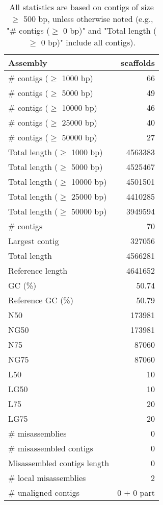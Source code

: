 \documentclass[12pt,a4paper]{article}
\begin{document}
\begin{table}[ht]
\begin{center}
\caption{All statistics are based on contigs of size $\geq$ 500 bp, unless otherwise noted (e.g., "\# contigs ($\geq$ 0 bp)" and "Total length ($\geq$ 0 bp)" include all contigs).}
\begin{tabular}{|l*{1}{|r}|}
\hline
Assembly & scaffolds \\ \hline
\# contigs ($\geq$ 1000 bp) & 66 \\ \hline
\# contigs ($\geq$ 5000 bp) & 49 \\ \hline
\# contigs ($\geq$ 10000 bp) & 46 \\ \hline
\# contigs ($\geq$ 25000 bp) & 40 \\ \hline
\# contigs ($\geq$ 50000 bp) & 27 \\ \hline
Total length ($\geq$ 1000 bp) & 4563383 \\ \hline
Total length ($\geq$ 5000 bp) & 4525467 \\ \hline
Total length ($\geq$ 10000 bp) & 4501501 \\ \hline
Total length ($\geq$ 25000 bp) & 4410285 \\ \hline
Total length ($\geq$ 50000 bp) & 3949594 \\ \hline
\# contigs & 70 \\ \hline
Largest contig & 327056 \\ \hline
Total length & 4566281 \\ \hline
Reference length & 4641652 \\ \hline
GC (\%) & 50.74 \\ \hline
Reference GC (\%) & 50.79 \\ \hline
N50 & 173981 \\ \hline
NG50 & 173981 \\ \hline
N75 & 87060 \\ \hline
NG75 & 87060 \\ \hline
L50 & 10 \\ \hline
LG50 & 10 \\ \hline
L75 & 20 \\ \hline
LG75 & 20 \\ \hline
\# misassemblies & 0 \\ \hline
\# misassembled contigs & 0 \\ \hline
Misassembled contigs length & 0 \\ \hline
\# local misassemblies & 2 \\ \hline
\# unaligned contigs & 0 + 0 part \\ \hline

\end{tabular}
\end{center}
\end{table}
\end{document}
